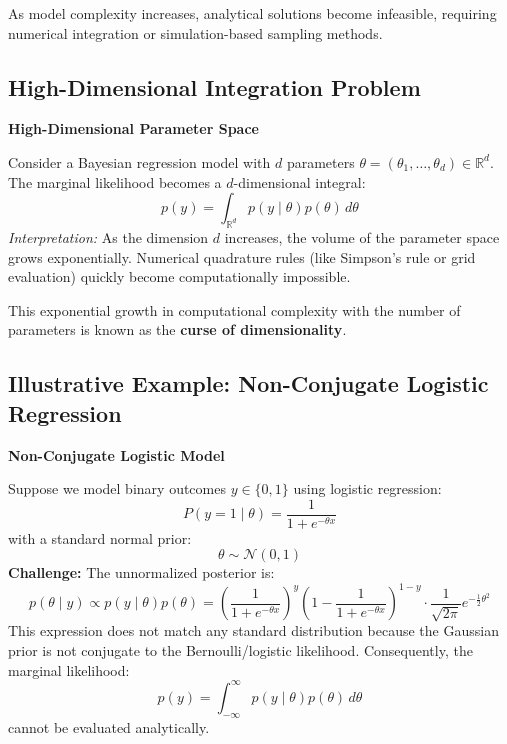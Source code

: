 \documentclass[12pt,a4paper]{article}
\begin{document}
\begin{keyidea}
As model complexity increases, analytical solutions become infeasible, requiring numerical integration or simulation-based sampling methods.
\end{keyidea}

\subsection{High-Dimensional Integration Problem}

\begin{example}
\textbf{High-Dimensional Parameter Space}

Consider a Bayesian regression model with $d$ parameters $\theta = (\theta_1, \ldots, \theta_d) \in \mathbb{R}^d$. The marginal likelihood becomes a $d$-dimensional integral:
\[
p(y) = \int_{\mathbb{R}^d} p(y \mid \theta) p(\theta) \, d\theta
\]
\textit{Interpretation:} As the dimension $d$ increases, the volume of the parameter space grows exponentially. Numerical quadrature rules (like Simpson's rule or grid evaluation) quickly become computationally impossible.
\end{example}

\begin{keyidea}
This exponential growth in computational complexity with the number of parameters is known as the \textbf{curse of dimensionality}.
\end{keyidea}

\subsection{Illustrative Example: Non-Conjugate Logistic Regression}

\begin{example}
\textbf{Non-Conjugate Logistic Model}

Suppose we model binary outcomes $y \in \{0, 1\}$ using logistic regression:
\[
P(y = 1 \mid \theta) = \frac{1}{1 + e^{-\theta x}}
\]
with a standard normal prior:
\[
\theta \sim \mathcal{N}(0, 1)
\]
\textbf{Challenge:} The unnormalized posterior is:
\[
p(\theta \mid y) \propto p(y \mid \theta) p(\theta) = \left(\frac{1}{1 + e^{-\theta x}}\right)^y \left(1 - \frac{1}{1 + e^{-\theta x}}\right)^{1-y} \cdot \frac{1}{\sqrt{2\pi}} e^{-\frac{1}{2}\theta^2}
\]
This expression does not match any standard distribution because the Gaussian prior is not conjugate to the Bernoulli/logistic likelihood. Consequently, the marginal likelihood:
\[
p(y) = \int_{-\infty}^{\infty} p(y \mid \theta) p(\theta) \, d\theta
\]
cannot be evaluated analytically.
\end{example}
\end{document}
